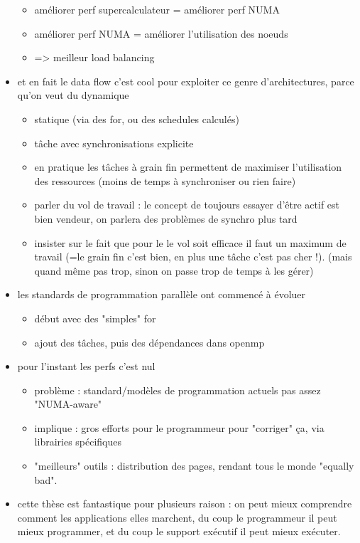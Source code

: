 \begin{itemize}
  \begin{itemize}
    \item améliorer perf supercalculateur = améliorer perf NUMA
    \item améliorer perf NUMA = améliorer l'utilisation des noeuds
    \item => meilleur load balancing
  \end{itemize}
  \item et en fait le data flow c'est cool pour exploiter ce genre d'architectures, parce qu'on veut du dynamique
  \begin{itemize}
    \item statique (via des for, ou des schedules calculés)
    \item tâche avec synchronisations explicite
    \item en pratique les tâches à grain fin permettent de maximiser l'utilisation des ressources (moins de temps à synchroniser ou rien faire)
    \item parler du vol de travail : le concept de toujours essayer d'être actif est bien vendeur, on parlera des problèmes de synchro plus tard
    \item insister sur le fait que pour le le vol soit efficace il faut un maximum de travail (=le grain fin c'est bien, en plus une tâche c'est pas cher !). (mais quand même pas trop, sinon on passe trop de temps à les gérer)
  \end{itemize}
  \item les standards de programmation parallèle ont commencé à évoluer
  \begin{itemize}
    \item début avec des "simples" for
    \item ajout des tâches, puis des dépendances dans openmp
  \end{itemize}
  \item pour l'instant les perfs c'est nul
  \begin{itemize}
    \item problème : standard/modèles de programmation actuels pas assez "NUMA-aware"
    \item implique : gros efforts pour le programmeur pour "corriger" ça, via librairies spécifiques
    \item "meilleurs" outils : distribution des pages, rendant tous le monde "equally bad".
  \end{itemize}
  \item cette thèse est fantastique pour plusieurs raison : on peut mieux comprendre comment les applications elles marchent, du coup le programmeur il peut mieux programmer, et du coup le support exécutif il peut mieux exécuter.

\end{itemize}
